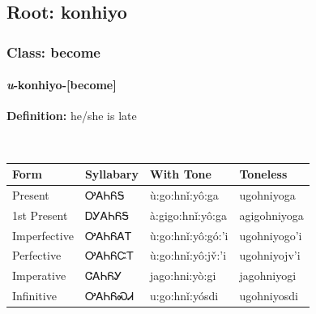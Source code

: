 \needspace{4in}
\subsection*{Root: konhiyo}
\nopagebreak
{}
\needspace{3in}
\subsubsection*{Class: become}
\nopagebreak
\needspace{2in}
\paragraph*{\textit{u}{-}\textbf{konhiyo}{-}[become]}
\nopagebreak
\textbf{Definition: } he/she is late
\\[0.5em]
\begin{tabularx}{\textwidth}{l X X X}%
\toprule%
\textbf{Form}&\textbf{Syllabary}&\textbf{With Tone}&\textbf{Toneless}\\%
\midrule%
Present&ᎤᎪᏂᏲᎦ&ù:go:hnǐ:yô:ga&ugohniyoga\\%
1st Present&ᎠᎩᎪᏂᏲᎦ&à:gigo:hnǐ:yô:ga&agigohniyoga\\%
Imperfective&ᎤᎪᏂᏲᎪᎢ&ù:go:hnǐ:yô:gó:’i&ugohniyogo’i\\%
Perfective&ᎤᎪᏂᏲᏨᎢ&ù:go:hnǐ:yô:jv̌:’i&ugohniyojv’i\\%
Imperative&ᏣᎪᏂᏲᎩ&jago:hni:yò:gi&jagohniyogi\\%
Infinitive&ᎤᎪᏂᏲᏍᏗ&u:go:hnǐ:yósdi&ugohniyosdi\\%
\bottomrule%
\end{tabularx}
\\[1em]